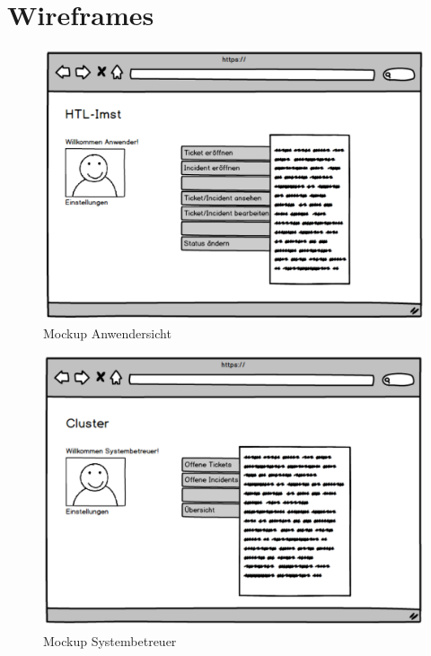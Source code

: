 \newpage
\section{Wireframes}	
\begin{figure}[h]
	\centering
	\includegraphics[scale=0.44]{figures/Wireframe_Anwender.png}
	\caption{Mockup Anwendersicht}
	\label{Abb_Mockup_Anwendersicht}
\end{figure}

\vspace{-.5cm}
\begin{figure}[h]
	\centering
	\includegraphics[scale=0.399]{figures/Wireframe_Systembetreuer.png}
	\caption{Mockup Systembetreuer}
	\label{Abb_Mockup_Systembetreuer}
\end{figure}



